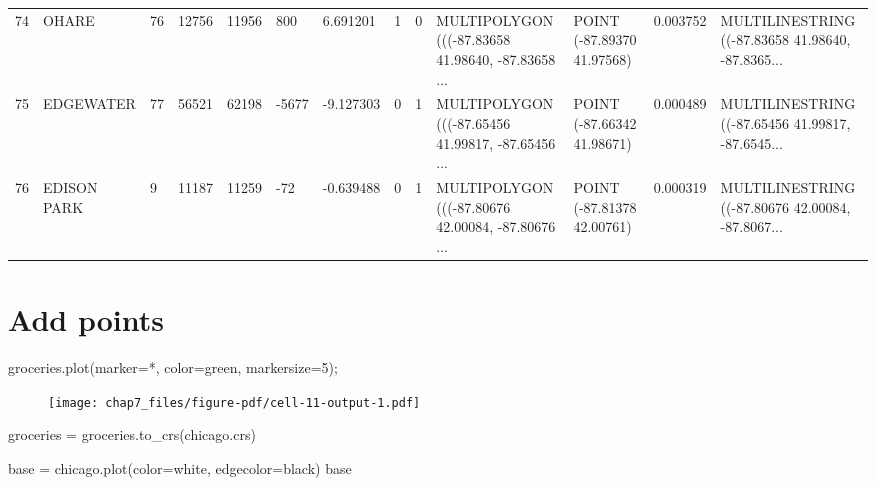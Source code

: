 \documentclass[
  letterpaper,
  DIV=11,
  numbers=noendperiod]{scrreprt}
\newenvironment{Shaded}{\begin{snugshade}}{\end{snugshade}}
\newcommand{\DecValTok}[1]{\textcolor[rgb]{0.68,0.00,0.00}{#1}}
\newcommand{\NormalTok}[1]{\textcolor[rgb]{0.00,0.23,0.31}{#1}}
\newcommand{\OperatorTok}[1]{\textcolor[rgb]{0.37,0.37,0.37}{#1}}
\newcommand{\StringTok}[1]{\textcolor[rgb]{0.13,0.47,0.30}{#1}}
\begin{document}
\begin{longtable}[]{@{}lllllllllllll@{}}
74 & OHARE & 76 & 12756 & 11956 & 800 & 6.691201 & 1 & 0 & MULTIPOLYGON
(((-87.83658 41.98640, -87.83658 ... & POINT (-87.89370 41.97568) &
0.003752 & MULTILINESTRING ((-87.83658 41.98640, -87.8365... \\
75 & EDGEWATER & 77 & 56521 & 62198 & -5677 & -9.127303 & 0 & 1 &
MULTIPOLYGON (((-87.65456 41.99817, -87.65456 ... & POINT (-87.66342
41.98671) & 0.000489 & MULTILINESTRING ((-87.65456 41.99817,
-87.6545... \\
76 & EDISON PARK & 9 & 11187 & 11259 & -72 & -0.639488 & 0 & 1 &
MULTIPOLYGON (((-87.80676 42.00084, -87.80676 ... & POINT (-87.81378
42.00761) & 0.000319 & MULTILINESTRING ((-87.80676 42.00084,
-87.8067... \\
\end{longtable}

\hypertarget{add-points}{%
\section{Add points}\label{add-points}}

\begin{Shaded}
\begin{Highlighting}[]
\NormalTok{groceries.plot(marker}\OperatorTok{=}\StringTok{\textquotesingle{}*\textquotesingle{}}\NormalTok{, color}\OperatorTok{=}\StringTok{\textquotesingle{}green\textquotesingle{}}\NormalTok{, markersize}\OperatorTok{=}\DecValTok{5}\NormalTok{)}\OperatorTok{;}
\end{Highlighting}
\end{Shaded}

\begin{figure}[H]

{\centering \texttt{[image: chap7\_files/figure-pdf/cell-11-output-1.pdf]}

}

\end{figure}

\begin{Shaded}
\begin{Highlighting}[]
\NormalTok{groceries }\OperatorTok{=}\NormalTok{ groceries.to\_crs(chicago.crs)}
\end{Highlighting}
\end{Shaded}

\begin{Shaded}
\begin{Highlighting}[]
\NormalTok{base }\OperatorTok{=}\NormalTok{ chicago.plot(color}\OperatorTok{=}\StringTok{\textquotesingle{}white\textquotesingle{}}\NormalTok{, edgecolor}\OperatorTok{=}\StringTok{\textquotesingle{}black\textquotesingle{}}\NormalTok{)}
\NormalTok{base}
\end{Highlighting}
\end{Shaded}
\end{document}
